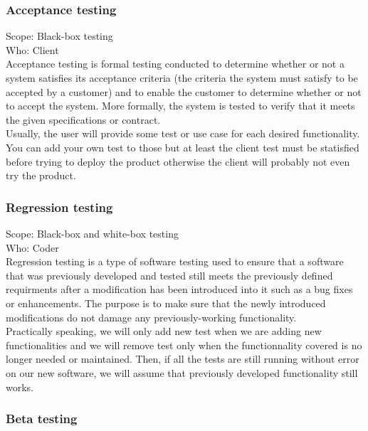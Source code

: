 \documentclass[12pt]{article}
\begin{document}
\subsubsection{Acceptance testing}

Scope: Black-box testing\\
Who: Client\\

Acceptance testing is formal testing conducted to determine whether or not a system satisfies its acceptance criteria (the criteria the system must satisfy to be accepted by a customer) and to enable the customer to determine whether or not to accept the system. More formally, the system is tested to verify that it meets the given specifications or contract.\\

Usually, the user will provide some test or use case for each desired functionality. You can add your own test to those but at least the client test must be statisfied before trying to deploy the product otherwise the client will probably not even try the product.

\subsubsection{Regression testing}

Scope: Black-box and white-box testing\\
Who: Coder\\

Regression testing is a type of software testing used to ensure that a software that was previously developed and tested still meets the previously defined requirments after a modification has been introduced into it such as a bug fixes or enhancements. The purpose is to make sure that the newly introduced modifications do not damage any previously-working functionality.\\

Practically speaking, we will only add new test when we are adding new functionalities and we will remove test only when the functionnality covered is no longer needed or maintained. Then, if all the tests are still running without error on our new software, we will assume that previously developed functionality still works.

\subsubsection{Beta testing}
\end{document}
